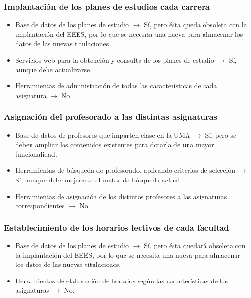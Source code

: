 \documentclass[11pt,a4paper,spanish,twoside]{report}
\begin{document}
\subsubsection{Implantación de los planes de estudios cada carrera}
\begin{itemize}
\item Base de datos de los planes de estudio $\to$ Sí, pero ésta queda
  obsoleta con la implantación del EEES, por lo que se
  necesita una nueva para almacenar los datos de las nuevas titulaciones. 
\item Servicios web para la obtención y consulta de los planes de estudio
  $\to$ Sí, aunque debe actualizarse. 
\item Herramientas de administración de todas las características de cada
  asignatura $\to$ No. 
\end{itemize}

\subsubsection{Asignación del profesorado a las distintas asignaturas}
\begin{itemize}
\item Base de datos de profesores que imparten clase en la UMA $\to$ Sí, pero
  se deben ampliar los contenidos existentes para dotarla de una mayor
  funcionalidad. 
\item Herramientas de búsqueda de profesorado, aplicando criterios de
  selección $\to$ Sí, aunque debe mejorarse el motor de búsqueda actual. 
\item Herramientas de asignación de los distintos profesores a las
  asignaturas correspondientes $\to$ No.
\end{itemize}

\subsubsection{Establecimiento de los horarios lectivos de cada facultad}
\begin{itemize}
\item Base de datos de los planes de estudio $\to$ Sí, pero ésta quedará
  obsoleta con la implantación del EEES, por lo que se
  necesita una nueva para almacenar los datos de las nuevas titulaciones. 
\item Herramientas de elaboración de horarios según las características de
  las asignaturas $\to$ No. 
\end{itemize}
\end{document}
